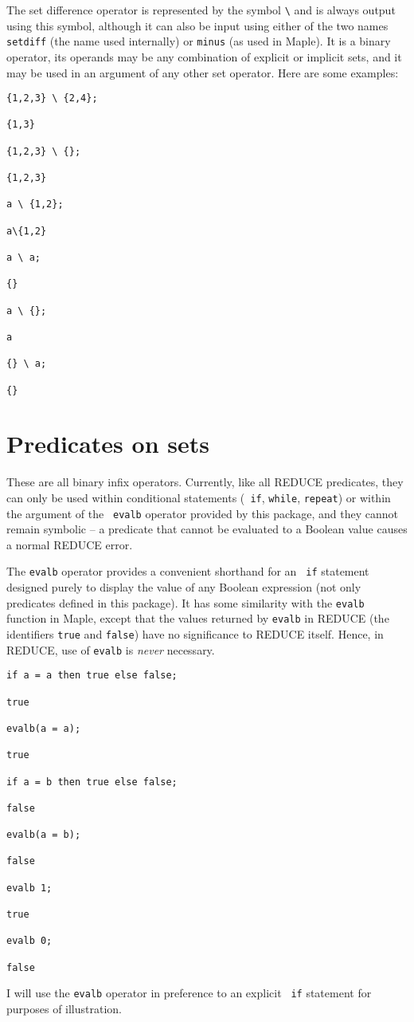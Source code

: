 The set difference operator is represented by the symbol \verb|\| and
is always output using this symbol, although it can also be input using
either of the two names {\tt setdiff} (the name used internally) or
{\tt minus} (as used in Maple).  It is a binary operator, its operands
may be any combination of explicit or implicit sets, and it may be
used in an argument of any other set operator.  Here are some
examples:
\begin{verbatim}
{1,2,3} \ {2,4};

{1,3}

{1,2,3} \ {};

{1,2,3}

a \ {1,2};

a\{1,2}

a \ a;

{}

a \ {};

a

{} \ a;

{}
\end{verbatim}


\section{Predicates on sets}

These are all binary infix operators.  Currently, like all REDUCE
predicates, they can only be used within conditional statements ({\tt
if}, {\tt while}, {\tt repeat}) or within the argument of the {\tt
evalb} operator provided by this package, and they cannot remain
symbolic -- a predicate that cannot be evaluated to a Boolean value
causes a normal REDUCE error.

The {\tt evalb} operator provides a convenient shorthand for an {\tt
if} statement designed purely to display the value of any Boolean
expression (not only predicates defined in this package).  It has some
similarity with the {\tt evalb} function in Maple, except that the
values returned by {\tt evalb} in REDUCE (the identifiers {\tt true}
and {\tt false}) have no significance to REDUCE itself.  Hence, in
REDUCE, use of {\tt evalb} is {\em never\/} necessary.
\begin{verbatim}
if a = a then true else false;

true

evalb(a = a);

true

if a = b then true else false;

false

evalb(a = b);

false

evalb 1;

true

evalb 0;

false
\end{verbatim}
I will use the {\tt evalb} operator in preference to an explicit {\tt
if} statement for purposes of illustration.


